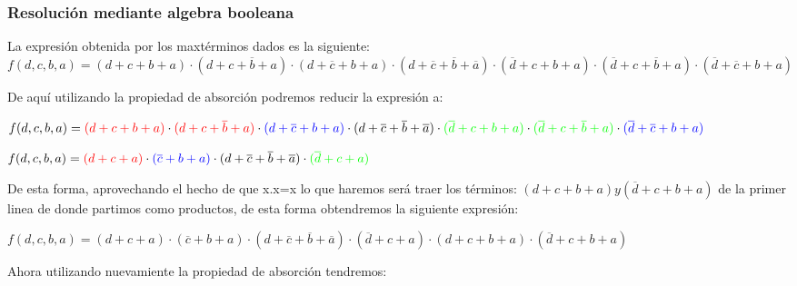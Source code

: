\subsubsection{Resoluci\'on mediante algebra booleana}
\vspace{3mm}
\noindent
La expresi\'on obtenida por los maxt\'erminos dados es la siguiente:\\


$f(d,c,b,a)=(d+c+b+a)\cdot(d+c+\overline{b}+a)\cdot(d+\overline{c}+b+a)\cdot(d+\overline{c}+\overline{b}+\overline{a})\cdot(\overline{d}+c+b+a)\cdot(\overline{d}+c+\overline{b}+a)\cdot(\overline{d}+\overline{c}+b+a) $
\vspace{3mm}


\noindent
De aqu\'i utilizando la propiedad de absorci\'on podremos reducir la expresi\'on a:\par
\vspace{3mm}

$f(d,c,b,a)=\color{red}{(d+c+b+a)}\color{black}\cdot\color{red}{(d+c+\overline{b}+a)}\color{black}\cdot\color{blue}{(d+\overline{c}+b+a)}\color{black}\cdot\color{black}{(d+\overline{c}+\overline{b}+\overline{a})}\color{black}\cdot\color{green}{(\overline{d}+c+b+a)}\color{black}\cdot\color{green}{(\overline{d}+c+\overline{b}+a)}\color{black}\cdot\color{blue}{(\overline{d}+\overline{c}+b+a)}$
\vspace{5mm}\par
$f(d,c,b,a)=\color{red}{(d+c+a)}\color{black}\cdot\color{blue}{(\overline{c}+b+a)}\color{black}\cdot\color{black}{(d+\overline{c}+\overline{b}+\overline{a})}\color{black}\cdot\color{green}{(\overline{d}+c+a)}$
\vspace{5mm}\par

\noindent
De esta forma, aprovechando el hecho de que x.x=x lo que haremos ser\'a traer los t\'erminos: $(d+c+b+a) y (\overline{d}+c+b+a)$ de la primer linea de donde partimos como productos, de esta forma obtendremos la siguiente expresi\'on:\par
\vspace{3mm}

$f(d,c,b,a)={(d+c+a)}\cdot{(\overline{c}+b+a)}\cdot{(d+\overline{c}+\overline{b}+\overline{a})}\cdot{(\overline{d}+c+a)}\cdot{(d+c+b+a)}\cdot{(\overline{d}+c+b+a)}$
\vspace{5mm}\par

\noindent
Ahora utilizando nuevamiente la propiedad de absorci\'on tendremos:\par
\vspace{3mm}

